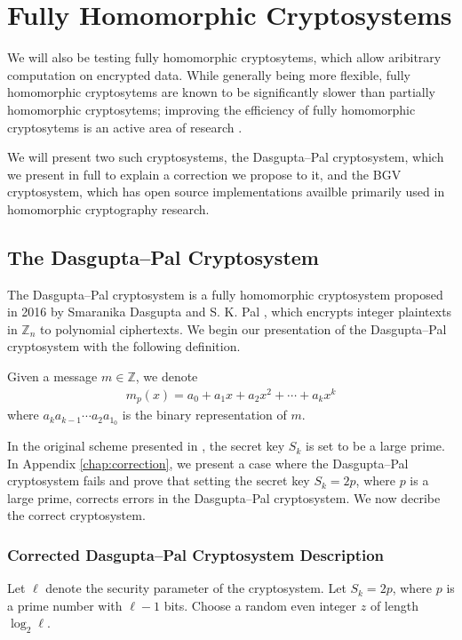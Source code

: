 \section{Fully Homomorphic Cryptosystems}

We will also be testing fully homomorphic cryptosytems, which allow aribitrary computation on encrypted data.
While generally being more flexible, fully homomorphic cryptosytems are known to be significantly slower than partially homomorphic cryptosytems; improving the efficiency of fully homomorphic cryptosytems is an active area of research \cite{sen_homomorphic_2013}.

We will present two such cryptosystems, the Dasgupta--Pal cryptosystem, which we present in full to explain a correction we propose to it, and the BGV cryptosystem, which has open source implementations availble primarily used in homomorphic cryptography research.

\subsection{The Dasgupta--Pal Cryptosystem}
The Dasgupta--Pal cryptosystem is a fully homomorphic cryptosystem proposed in 2016 by Smaranika Dasgupta and S. K. Pal \cite{dasgupta_design_2016}, which encrypts integer plaintexts in $\mathbb{Z}_n$ to polynomial ciphertexts. We begin our presentation of the Dasgupta--Pal cryptosystem with the following definition.

Given a message $m \in \mathbb{Z}$, we denote
\begin{align*}
		m_p(x) = a_0 + a_1x + a_2x^2 + \cdots + a_kx^k
\end{align*}
where $a_ka_{k-1}\cdots a_2a_1_0$ is the binary representation of $m$.

In the original scheme presented in \cite{dasgupta_design_2016}, the secret key $S_k$ is set to be a large prime. In Appendix \ref{chap:correction}, we present a case where the Dasgupta--Pal cryptosystem fails and prove that setting the secret key $S_k = 2p$, where $p$ is a large prime, corrects errors in the Dasgupta--Pal cryptosystem.
We now decribe the correct cryptosystem.
\subsubsection{Corrected Dasgupta--Pal Cryptosystem Description}
Let $\ell$ denote the security parameter of the cryptosystem.
Let $S_k = 2p$, where $p$ is a prime number with $\ell - 1$ bits.
Choose a random even integer $z$ of length $\log_2{\ell}$.

